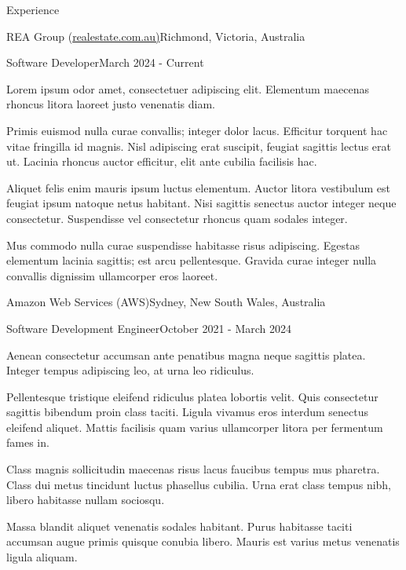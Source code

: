 \documentclass{cv}
\begin{document}
\begin{cvsection}{Experience}

\begin{cvheading}{REA Group (\href{https://realestate.com.au/}{realestate.com.au)}}{Richmond, Victoria, Australia}
\begin{cvsubheading}{Software Developer}{March 2024 - Current}
\item Lorem ipsum odor amet, consectetuer adipiscing elit. Elementum maecenas rhoncus litora laoreet justo venenatis diam.
\item Primis euismod nulla curae convallis; integer dolor lacus. Efficitur torquent hac vitae fringilla id magnis. Nisl adipiscing erat suscipit, feugiat sagittis lectus erat ut. Lacinia rhoncus auctor efficitur, elit ante cubilia facilisis hac.
\item Aliquet felis enim mauris ipsum luctus elementum. Auctor litora vestibulum est feugiat ipsum natoque netus habitant. Nisi sagittis senectus auctor integer neque consectetur. Suspendisse vel consectetur rhoncus quam sodales integer.
\item Mus commodo nulla curae suspendisse habitasse risus adipiscing. Egestas elementum lacinia sagittis; est arcu pellentesque. Gravida curae integer nulla convallis dignissim ullamcorper eros laoreet.
\end{cvsubheading}
\end{cvheading}

\begin{cvheading}{Amazon Web Services (AWS)}{Sydney, New South Wales, Australia}
\begin{cvsubheading}{Software Development Engineer}{October 2021 - March 2024}
\item Aenean consectetur accumsan ante penatibus magna neque sagittis platea. Integer tempus adipiscing leo, at urna leo ridiculus.
\item Pellentesque tristique eleifend ridiculus platea lobortis velit. Quis consectetur sagittis bibendum proin class taciti. Ligula vivamus eros interdum senectus eleifend aliquet. Mattis facilisis quam varius ullamcorper litora per fermentum fames in.
\item Class magnis sollicitudin maecenas risus lacus faucibus tempus mus pharetra. Class dui metus tincidunt luctus phasellus cubilia. Urna erat class tempus nibh, libero habitasse nullam sociosqu.
\item Massa blandit aliquet venenatis sodales habitant. Purus habitasse taciti accumsan augue primis quisque conubia libero. Mauris est varius metus venenatis ligula aliquam.
\end{cvsubheading}
\end{cvheading}


\end{cvsection}
\end{document}
